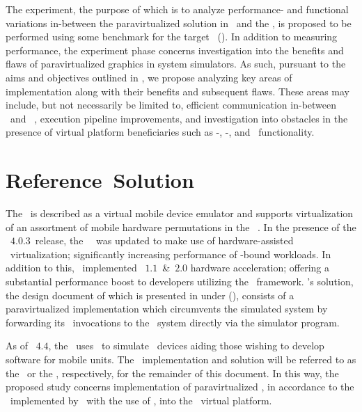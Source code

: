 The experiment, the purpose of which is to analyze performance- and functional variations in-between the paravirtualized solution in \termsimics\ and the \termrefsolu , is proposed to be performed using some benchmark for the target \termapi\ ().
In addition to measuring performance, the experiment phase concerns investigation into the benefits and flaws of paravirtualized graphics in system simulators.
As such, pursuant to the aims and objectives outlined in , we propose analyzing key areas of implementation along with their benefits and subsequent flaws.
These areas may include, but not necessarily be limited to, efficient communication in-between \termtarget\ and \termhost\ , execution pipeline improvements, and investigation into obstacles in the presence of virtual platform beneficiaries such as \termdetexe -, \termcheckpointing -, and \termrevexe\ functionality.


\section{Reference~Solution}
\label{sec:researchmethodology_referencesolution}
The \termandroidemu\ is described as a virtual mobile device emulator and supports virtualization of an assortment of mobile hardware permutations in the \termandroid ~\termsdk {}.
In the presence of the \termandroid ~$4.0.3$\ release, the \termandroid ~\termsdk\ was updated to make use of hardware-assisted \termxeightysix\ virtualization; significantly increasing performance of \termcpu -bound workloads.
In addition to this, \termgoogle\ implemented \termopengles ~$1.1$~\&~$2.0$ hardware acceleration; offering a substantial performance boost to developers utilizing the \termopengles\ framework.
\termgoogle 's solution, the design document of which is presented in under  (), consists of a paravirtualized implementation which circumvents the simulated system by forwarding its \termopengles\ invocations to the \termhost\ system directly via the simulator program.

As of \termandroid ~$4.4$, the \termandroidemu\ uses \termqemu\ to simulate \termarm\ devices aiding those wishing to develop software for mobile units.
The \termandroidemu\ implementation and solution will be referred to as the \termrefimpl\ or the \termrefsolu , respectively, for the remainder of this document.
In this way, the proposed study concerns implementation of paravirtualized \termopengles , in accordance to the \termrefsolu\ implemented by \termgoogle\ with the use of \termqemu , into the \termsimics\ virtual platform.

